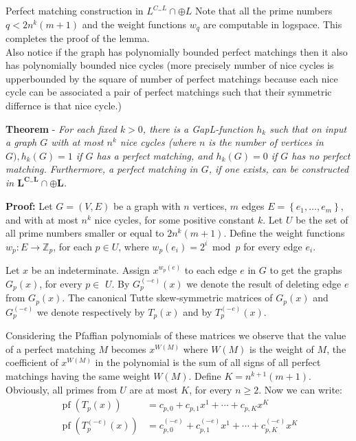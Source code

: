 \documentclass{beamer}
\begin{document}
\begin{frame}[allowframebreaks]{Perfect matching construction in $L^{C_=L} \cap \oplus L$}
	Note that all the prime numbers $q<2 n^k(m+1)$ and the weight functions $w_q$ are computable in logspace. This completes the proof of the lemma.
	\\
	\break
	Also notice if the graph has polynomially bounded perfect matchings then it also has polynomially bounded nice cycles (more precisely number of nice cycles is upperbounded by the square of number of perfect matchings because each nice cycle can be associated a pair of perfect matchings such that their symmetric differnce is that nice cycle.)
	
	\break
	\textbf{Theorem} - \textit{For each fixed $k>0$, there is a GapL-function $h_k$ such that on input a graph $G$ with at most $n^k$ nice cycles (where $n$ is the number of vertices in $G), h_k(G)=1$ if $G$ has a perfect matching, and $h_k(G)=0$ if $G$ has no perfect matching. Furthermore, a perfect matching in $G$, if one exists, can be constructed in $\mathbf{L}^{\mathbf{C}_= \mathbf{L}} \cap \oplus \mathbf{L}$.}
	
	\textbf{Proof:} Let $G=(V, E)$ be a graph with $n$ vertices, $m$ edges $E=\left\{e_1, \ldots, e_m\right\}$, and with at most $n^k$ nice cycles, for some positive constant $k$. Let $U$ be the set of all prime numbers smaller or equal to $2 n^k(m+1)$. Define the weight functions $w_p: E \rightarrow \mathbb{Z}_p$, for each $p \in U$, where $w_p\left(e_i\right)=2^i \bmod p$ for every edge $e_i$.
	
	Let $x$ be an indeterminate. Assign $x^{w_p(e)}$ to each edge $e$ in $G$ to get the graphs $G_p(x)$, for every $p \in$ $U$. By $G_p^{(-e)}(x)$ we denote the result of deleting edge $e$ from $G_p(x)$. The canonical Tutte skew-symmetric matrices of $G_p(x)$ and $G_p^{(-e)}$ we denote respectively by $T_p(x)$ and by $T_p^{(-e)}(x)$.
	
	Considering the Pfaffian polynomials of these matrices we observe that the value of a perfect matching $M$ becomes $x^{W(M)}$ where $W(M)$ is the weight of $M$, the coefficient of $x^{W(M)}$ in the polynomial is the sum of all signs of all perfect matchings having the same weight $W(M)$. Define $K=n^{k+1}(m+1)$. Obviously, all primes from $U$ are at most $K$, for every $n \geq 2$. Now we can write:
	$$
	\begin{aligned}
		\operatorname{pf}\left(T_p(x)\right) & =c_{p, 0}+c_{p, 1} x^1+\cdots+c_{p, K} x^K \\
		\operatorname{pf}\left(T_p^{(-e)}(x)\right) & =c_{p, 0}^{(-e)}+c_{p, 1}^{(-e)} x^1+\cdots+c_{p, K}^{(-e)} x^K
	\end{aligned}
	$$
	

\end{frame}
\end{document}
